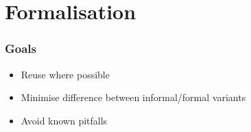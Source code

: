 \documentclass{beamer}
\let\oldframetitle\frametitle
\renewcommand{\frametitle}[1]{
  \oldframetitle{#1}\vspace{-3.5cm}
}
\begin{document}
\begin{comment}
by classical linear logic i mean a logic where negation is an involution which
restricts the use of certain rules on resources, namely that all linear
resources must be used (corresponding to prohibiting weakening) and that one
cannot duplicate a linear resource (corresponding to contraction). some typing
rules for the CP calculus are presented as they appear in the Coq encoding
(note that they are very similar to their informal counterparts). the
interpretation of tensor product is output of A and continue as B. The dual of
this is input of A and continue as the negation of B. Thus negation in
classical linear logic corresponds to session duality.
\end{comment}

\section{Formalisation}

\begin{frame}
\frametitle{Goals}
\begin{itemize}
\item Reuse where possible
\item Minimise difference between informal/formal variants
\item Avoid known pitfalls
\end{itemize}
\end{frame}

\begin{comment}
The encoding follows practices in formalising programming language metatheory
with a principal design goal of reusing existing libraries from previous
developments. Additionally, I want to keep as close a correspondence as
possible between the development and the pen-and-paper presentation in order
to mitigate questions of adequacy, you know, whether the formal system is what
you intended to formalise. And lastly, I aimed to exploit the features of the
Coq system without over complicating the development such as taking careful
consideration over representation choices.
\end{comment}
\end{document}
